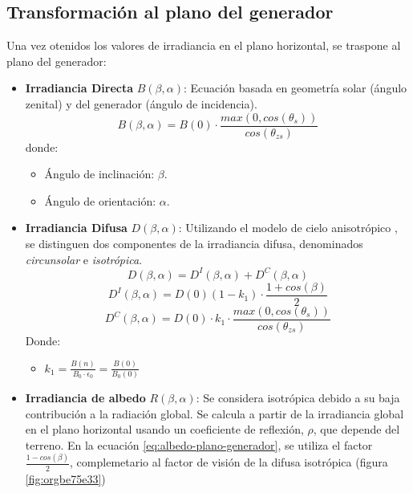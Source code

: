 \subsection{Transformación al plano del generador}
\label{sec:org180ae47}
\label{subsec:transformación-plano-generador}
Una vez otenidos los valores de irradiancia en el plano horizontal, se traspone al plano del generador:
\begin{itemize}
\item \textbf{Irradiancia Directa} \(B(\beta ,\alpha)\): Ecuación basada en geometría solar (ángulo zenital) y del generador (ángulo de incidencia).
\begin{equation}
B(\beta ,\alpha)=B(0)\cdot \frac{max(0,cos(\theta_s))}{cos(\theta_{zs})}
\label{eq:irradiancia-directa-plano-generador}
\end{equation}
donde:
\begin{itemize}
\item Ángulo de inclinación: \(\beta\).
\item Ángulo de orientación: \(\alpha\). 
\end{itemize}
\item \textbf{Irradiancia Difusa} \(D(\beta ,\alpha)\): Utilizando el modelo de cielo anisotrópico \cite{Perpinan2023}, se distinguen dos componentes de la irradiancia difusa, denominados \emph{circunsolar} e \emph{isotrópica}.  
\begin{equation}
D(\beta ,\alpha)=D^I(\beta ,\alpha)+D^C(\beta ,\alpha)
\end{equation}
\begin{equation}
D^I(\beta ,\alpha)=D(0)(1-k_1)\cdot \frac{1+cos(\beta)}{2}
\end{equation}
\begin{equation}
D^C(\beta, \alpha)=D(0)\cdot k_1\cdot \frac{max(0,cos(\theta_s))}{cos(\theta_{zs})}
\end{equation}
Donde:
\begin{itemize}
\item \(k_1=\frac{B(n)}{B_0\cdot \epsilon_0}=\frac{B(0)}{B_0(0)}\)
\end{itemize}
\item \textbf{Irradiancia de albedo} \(R(\beta ,\alpha)\): Se considera isotrópica debido a su baja contribución a la radiación global. Se calcula a partir de la irradiancia global en el plano horizontal usando un coeficiente de reflexión, \(\rho\), que depende del terreno. En la ecuación \ref{eq:albedo-plano-generador}, se utiliza el factor \(\frac{1-cos(\beta)}{2}\), complemetario al factor de visión de la difusa isotrópica (figura \ref{fig:orgbe75e33})

\end{itemize}
